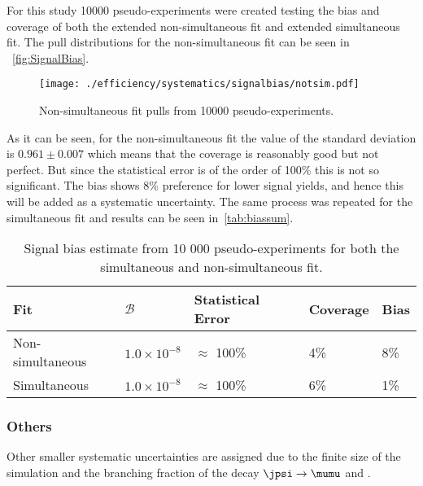 For this study 10000 pseudo-experiments were created testing the bias and coverage of both the extended non-simultaneous fit and extended simultaneous fit. The pull distributions for the non-simultaneous fit can be seen in ~\autoref{fig:SignalBias}.
\begin{figure}[H]
\centering
\texttt{[image: ./efficiency/systematics/signalbias/notsim.pdf]}
\caption{Non-simultaneous fit pulls from 10000 pseudo-experiments.}
\label{fig:SignalBias}
\end{figure}

As it can be seen, for the non-simultaneous fit the value of the standard deviation is $0.961\pm0.007$ which means that the coverage is reasonably good but not perfect. But since the statistical error is of the order of 100$\%$ this is not so significant.
The bias shows 8$\%$ preference for lower signal yields, and hence this will be added as a systematic uncertainty. The same process was repeated for the simultaneous fit and results can be seen in~\autoref{tab:biassum}. 

\begin{table}[H]
\begin{center}
\begin{tabular}{ l  l  l  l  l }
\toprule
        Fit & $\mathcal{B}$ & Statistical Error & Coverage & Bias \\
\hline
        Non-simultaneous  & $1.0\times 10^{-8}$ & $\approx$ 100\% & 4\% & 8\%   \\
        Simultaneous  & $1.0\times 10^{-8}$ & $\approx$ 100\% & 6\% & 1\%   \\
\bottomrule
\end{tabular}
\end{center}
\caption{Signal bias estimate from 10 000 pseudo-experiments for both the simultaneous and non-simultaneous fit.}
\label{tab:biassum}
\end{table}


\subsubsection{Others}
Other smaller systematic uncertainties are assigned due to the finite size of the simulation and the branching fraction of the decay $\jpsi \to \mumu$ and \bjpsik.



